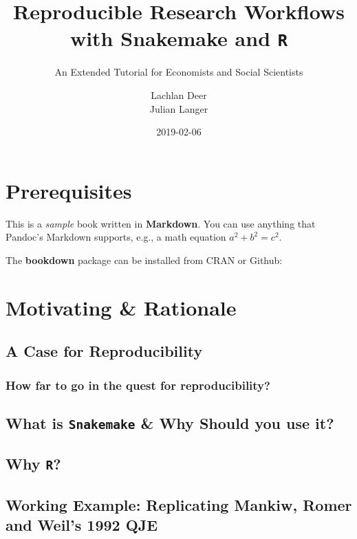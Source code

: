 \documentclass[]{book}
\title{Reproducible Research Workflows with Snakemake and \texttt{R}}
\subtitle{An Extended Tutorial for Economists and Social Scientists}
\author{Lachlan Deer \\ Julian Langer}
\date{2019-02-06}
\theoremstyle{definition}
\theoremstyle{definition}
\theoremstyle{definition}
\theoremstyle{remark}
\begin{document}
\maketitle

{
\setcounter{tocdepth}{1}
\tableofcontents
}
\chapter*{Prerequisites}\label{prerequisites}

This is a \emph{sample} book written in \textbf{Markdown}. You can use
anything that Pandoc's Markdown supports, e.g., a math equation
\(a^2 + b^2 = c^2\).

The \textbf{bookdown} package can be installed from CRAN or Github:

\chapter{Motivating \& Rationale}\label{intro}

\section{A Case for Reproducibility}\label{a-case-for-reproducibility}

\subsection{How far to go in the quest for
reproducibility?}\label{how-far-to-go-in-the-quest-for-reproducibility}

\section{\texorpdfstring{What is \texttt{Snakemake} \& Why Should you
use
it?}{What is Snakemake \& Why Should you use it?}}\label{what-is-snakemake-why-should-you-use-it}

\section{\texorpdfstring{Why \texttt{R}?}{Why R?}}\label{why-r}

\section{Working Example: Replicating Mankiw, Romer and Weil's 1992
QJE}\label{working-example-replicating-mankiw-romer-and-weils-1992-qje}
\end{document}
